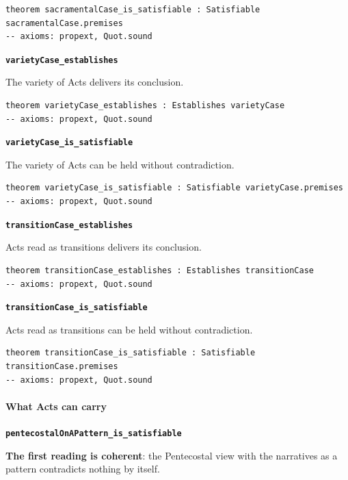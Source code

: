 \documentclass[11pt]{article}
\begin{document}
{\small\begin{verbatim}
theorem sacramentalCase_is_satisfiable : Satisfiable sacramentalCase.premises
-- axioms: propext, Quot.sound
\end{verbatim}}
\par\medskip\noindent\textbf{\texttt{variety\allowbreak{}Case\_\allowbreak{}establishes}}\par\nobreak\noindent
The variety of Acts delivers its conclusion.

{\small\begin{verbatim}
theorem varietyCase_establishes : Establishes varietyCase
-- axioms: propext, Quot.sound
\end{verbatim}}
\par\medskip\noindent\textbf{\texttt{variety\allowbreak{}Case\_\allowbreak{}is\_\allowbreak{}satisfiable}}\par\nobreak\noindent
The variety of Acts can be held without contradiction.

{\small\begin{verbatim}
theorem varietyCase_is_satisfiable : Satisfiable varietyCase.premises
-- axioms: propext, Quot.sound
\end{verbatim}}
\par\medskip\noindent\textbf{\texttt{transition\allowbreak{}Case\_\allowbreak{}establishes}}\par\nobreak\noindent
Acts read as transitions delivers its conclusion.

{\small\begin{verbatim}
theorem transitionCase_establishes : Establishes transitionCase
-- axioms: propext, Quot.sound
\end{verbatim}}
\par\medskip\noindent\textbf{\texttt{transition\allowbreak{}Case\_\allowbreak{}is\_\allowbreak{}satisfiable}}\par\nobreak\noindent
Acts read as transitions can be held without contradiction.

{\small\begin{verbatim}
theorem transitionCase_is_satisfiable : Satisfiable transitionCase.premises
-- axioms: propext, Quot.sound
\end{verbatim}}
\paragraph*{What Acts can carry}
\leavevmode\par\nobreak
\par\medskip\noindent\textbf{\texttt{pentecostal\allowbreak{}On\allowbreak{}APattern\_\allowbreak{}is\_\allowbreak{}satisfiable}}\par\nobreak\noindent
\textbf{The first reading is coherent}: the Pentecostal view with the narratives as a pattern contradicts nothing by itself.
\end{document}
